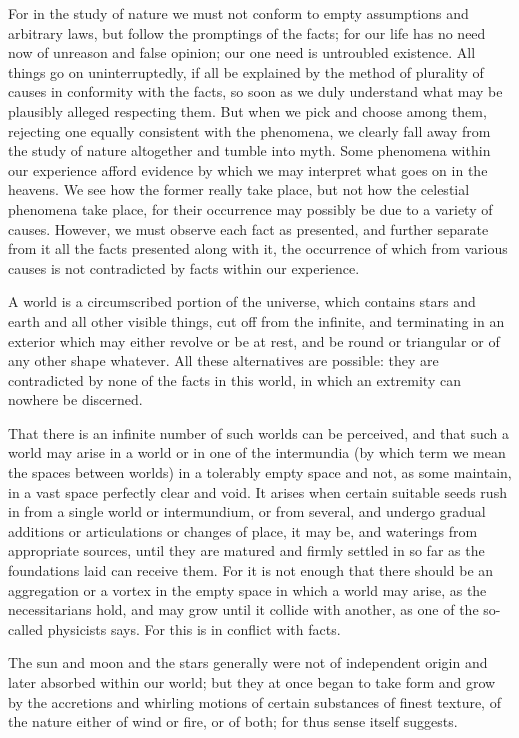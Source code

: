 \documentclass{stex}
\begin{document}
For in the study of nature we must not conform to empty assumptions and arbitrary laws, but follow the promptings of the facts; for our life has no need now of unreason and false opinion; our one need is untroubled existence.
All things go on uninterruptedly, if all be explained by the method of plurality of causes in conformity with the facts, so soon as we duly understand what may be plausibly alleged respecting them.
But when we pick and choose among them, rejecting one equally consistent with the phenomena, we clearly fall away from the study of nature altogether and tumble into myth.
Some phenomena within our experience afford evidence by which we may interpret what goes on in the heavens.
We see how the former really take place, but not how the celestial phenomena take place, for their occurrence may possibly be due to a variety of causes.
However, we must observe each fact as presented, and further separate from it all the facts presented along with it, the occurrence of which from various causes is not contradicted by facts within our experience.

A world is a circumscribed portion of the universe, which contains stars and earth and all other visible things, cut off from the infinite, and terminating in an exterior which may either revolve or be at rest, and be round or triangular or of any other shape whatever.
All these alternatives are possible: they are contradicted by none of the facts in this world, in which an extremity can nowhere be discerned.

That there is an infinite number of such worlds can be perceived, and that such a world may arise in a world or in one of the \foreignlanguage{latin}{intermundia} (by which term we mean the spaces between worlds) in a tolerably empty space and not, as some maintain, in a vast space perfectly clear and void.
It arises when certain suitable seeds rush in from a single world or \foreignlanguage{latin}{intermundium}, or from several, and undergo gradual additions or articulations or changes of place, it may be, and waterings from appropriate sources, until they are matured and firmly settled in so far as the foundations laid can receive them.
For it is not enough that there should be an aggregation or a vortex in the empty space in which a world may arise, as the necessitarians hold, and may grow until it collide with another, as one of the so-called physicists says.
For this is in conflict with facts.

The sun and moon and the stars generally were not of independent origin and later absorbed within our world; but they at once began to take form and grow by the accretions and whirling motions of certain substances of finest texture, of the nature either of wind or fire, or of both; for thus sense itself suggests.
\end{document}
